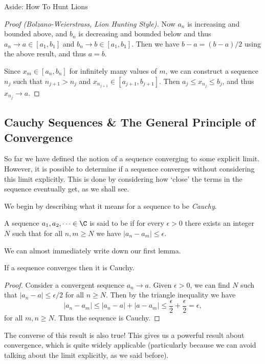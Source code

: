 \begin{aside}{Aside: How To Hunt Lions}
\begin{proof}[Proof (Bolzano-Weierstrass, Lion Hunting Style)]
	Now $a_n$ is increasing and bounded above, and $b_n$ is decreasing and bounded below and thus $a_n \rightarrow a \in [a_1, b_1]$ and $b_n \rightarrow b \in [a_1, b_1]$. Then we have $b - a = (b - a)/2$ using the above result, and thus $a = b$.

	Since $x_m \in [a_n, b_n]$ for infinitely many values of $m$, we can construct a sequence $n_j$ such that $n_{j + 1} > n_j$ and $x_{n_{j + 1}} \in [a_{j + 1}, b_{j + 1}]$. Then $a_j \leq x_{n_j} \leq b_j$, and thus $x_{n_j} \rightarrow a$.
\end{proof}
\end{aside}




\subsection{Cauchy Sequences \& The General Principle of Convergence}

So far we have defined the notion of a sequence converging to some explicit limit. However, it is possible to determine if a sequence converges without considering this limit explicitly. This is done by considering how `close' the terms in the sequence eventually get, as we shall see.

We begin by describing what it means for a sequence to be \emph{Cauchy}.

\begin{definition}
	A sequence $a_1, a_2, \dots \in \C$ is said to be  if for every $\epsilon > 0$ there exists an integer $N$ such that for all $n, m \geq N$ we have $|a_n - a_m| \leq \epsilon$.
\end{definition}

We can almost immediately write down our first lemma.

\begin{lemma}
	If a sequence converges then it is Cauchy.
\end{lemma}
\begin{proof}
	Consider a convergent sequence $a_n \rightarrow a$.
	Given $\epsilon > 0$, we can find $N$ such that
	$|a_n - a| \leq \epsilon / 2$ for all $n \geq N$.
	Then by the triangle inequality we have
	$$
	|a_n - a_m| \leq |a_n - a| + |a - a_m| \leq \frac{\epsilon}{2} + \frac{\epsilon}{2} = \epsilon,
	$$
	for all $m, n \geq N$. Thus the sequence is Cauchy.
\end{proof}

The converse of this result is also true! This gives us a powerful result about convergence, which is quite widely applicable (particularly because we can avoid talking about the limit explicitly, as we said before).

